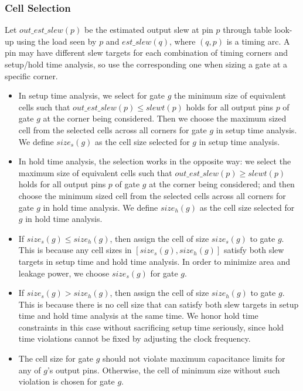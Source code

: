 \subsubsection{Cell Selection}

Let $out\_est\_slew(p)$ be the estimated output slew at pin $p$ through table look-up using the load seen by $p$ and $est\_slew(q)$, where $(q, p)$ is a timing arc. A pin may have different slew targets for each combination of timing corners and setup/hold time analysis, so use the corresponding one when sizing a gate at a specific corner.

\begin{itemize}
\item In setup time analysis, we select for gate $g$ the minimum size of equivalent cells such that $out\_est\_slew(p) \leq slewt(p)$ holds for all output pins $p$ of gate $g$ at the corner being considered. Then we choose the maximum sized cell from the selected cells across all corners for gate $g$ in setup time analysis. We define $size_{s}(g)$ as the cell size selected for $g$ in setup time analysis.

\item In hold time analysis, the selection works in the opposite way: we select the maximum size of equivalent cells such that $out\_est\_slew(p) \geq slewt(p)$ holds for all output pins $p$ of gate $g$ at the corner being considered; and then choose the minimum sized cell from the selected cells across all corners for gate $g$ in hold time analysis. We define $size_{h}(g)$ as the cell size selected for $g$ in hold time analysis.

\item If $size_{s}(g) \leq size_{h}(g)$, then assign the cell of size $size_{s}(g)$ to gate $g$. This is because any cell sizes in $[size_{s}(g), size_{h}(g)]$ satisfy both slew targets in setup time and hold time analysis. In order to minimize area and leakage power, we choose $size_{s}(g)$ for gate $g$.

\item If $size_{s}(g) > size_{h}(g)$, then assign the cell of size $size_{h}(g)$ to gate $g$. This is because there is no cell size that can satisfy both slew targets in setup time and hold time analysis at the same time. We honor hold time constraints in this case without sacrificing setup time seriously, since hold time violations cannot be fixed by adjusting the clock frequency.

\item The cell size for gate $g$ should not violate maximum capacitance limits for any of $g$'s output pins. Otherwise, the cell of minimum size without such violation is chosen for gate $g$.
\end{itemize}

